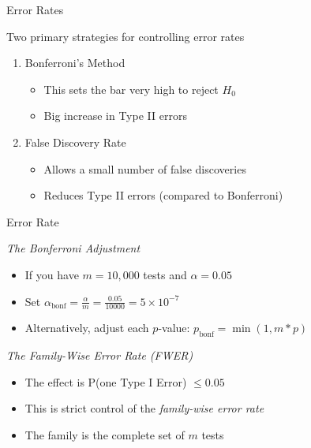 \documentclass[aspectratio=169,11pt]{beamer}
\begin{document}
\begin{frame}{Error Rates}

Two primary strategies for controlling error rates\\[5mm]

	\begin{enumerate}
		\item Bonferroni's Method
		\begin{itemize}
			\item This sets the bar very high to reject $H_0$
			\item Big increase in Type II errors
		\end{itemize}
		\item False Discovery Rate
		\begin{itemize}
			\item Allows a small number of false discoveries
			\item Reduces Type II errors (compared to Bonferroni)
		\end{itemize}
	\end{enumerate}


\end{frame}

\begin{frame}{Error Rate}

\textit{The Bonferroni Adjustment}

	\begin{itemize}
		\item If you have $m = 10,000$ tests and $\alpha = 0.05$
		\item Set $\alpha_{\text{bonf}} = \frac{\alpha}{m} = \frac{0.05}{10000} = 5\times10^{-7}$
		\item Alternatively, adjust each $p$-value: $p_{\text{bonf}} = \min(1, m*p)$\\[4mm]
	\end{itemize}

\pause
\textit{The Family-Wise Error Rate (FWER)}\\

	\begin{itemize}
		\item The effect is P(one Type I Error) $\leq 0.05$
		\item This is strict control of the \textit{family-wise error rate}
		\item The family is the complete set of $m$ tests
	\end{itemize}

\end{frame}
\end{document}
